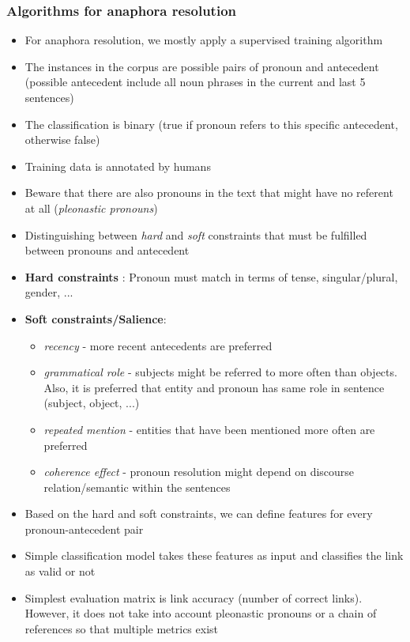 \subsubsection{Algorithms for anaphora resolution}
\begin{itemize}
	\item For anaphora resolution, we mostly apply a supervised training algorithm
	\item The instances in the corpus are possible pairs of pronoun and antecedent (possible antecedent include all noun phrases in the current and last 5 sentences)
	\item The classification is binary (true if pronoun refers to this specific antecedent, otherwise false)
	\item Training data is annotated by humans
	\item Beware that there are also pronouns in the text that might have no referent at all (\textit{pleonastic pronouns})
	\item Distinguishing between \textit{hard} and \textit{soft} constraints that must be fulfilled between pronouns and antecedent
	\item \textbf{Hard constraints} : Pronoun must match in terms of tense, singular/plural, gender, ...
	\item \textbf{Soft constraints/Salience}: 
	\begin{itemize}
		\item \textit{recency} -  more recent antecedents are preferred
		\item \textit{grammatical role} - subjects might be referred to more often than objects. Also, it is preferred that entity and pronoun has same role in sentence (subject, object, ...)
		\item \textit{repeated mention} - entities that have been mentioned more often are preferred
		\item \textit{coherence effect} - pronoun resolution might depend on discourse relation/semantic within the sentences
	\end{itemize}
	\item Based on the hard and soft constraints, we can define features for every pronoun-antecedent pair
	\item Simple classification model takes these features as input and classifies the link as valid or not
	\item Simplest evaluation matrix is link accuracy (number of correct links). However, it does not take into account pleonastic pronouns or a chain of references so that multiple metrics exist
\end{itemize}